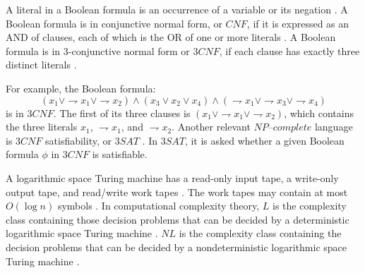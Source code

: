 \documentclass[a4paper,UKenglish,cleveref, autoref]{lipics-v2019}
\begin{document}
A literal in a Boolean formula is an occurrence of a variable or its negation \cite{CLRS01}. A Boolean formula is in conjunctive normal form, or $CNF$, if it is expressed as an AND of clauses, each of which is the OR of one or more literals \cite{CLRS01}. A Boolean formula is in 3-conjunctive normal form or $3CNF$, if each clause has exactly three distinct literals \cite{CLRS01}.

For example, the Boolean formula:
\[(x_{1} \vee \rightharpoondown x_{1} \vee \rightharpoondown x_{2}) \wedge (x_{3} \vee x_{2} \vee x_{4}) \wedge (\rightharpoondown x_{1} \vee \rightharpoondown x_{3} \vee \rightharpoondown x_{4})\]
is in $3CNF$. The first of its three clauses is $(x_{1} \vee \rightharpoondown x_{1} \vee \rightharpoondown x_{2})$, which contains the three literals $x_{1}$, $\rightharpoondown x_{1}$, and $\rightharpoondown x_{2}$. Another relevant $\textit{NP--complete}$ language is $3CNF$ satisfiability, or $3SAT$ \cite{CLRS01}. In $3SAT$, it is asked whether a given Boolean formula $\phi$ in $3CNF$ is satisfiable.

A logarithmic space Turing machine has a read-only input tape, a write-only output tape, and read/write work tapes \cite{MS06}. The work tapes may contain at most $O(\log n)$ symbols \cite{MS06}. In computational complexity theory, $L$ is the complexity class containing those decision problems that can be decided by a deterministic logarithmic space Turing machine \cite{Pap03}. $NL$ is the complexity class containing the decision problems that can be decided by a nondeterministic logarithmic space Turing machine \cite{Pap03}.
\end{document}
